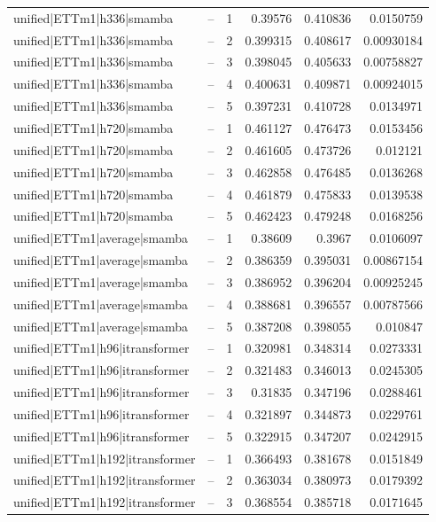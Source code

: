 \begin{longtable}{llrrrr}
unified|ETTm1|h336|smamba & -- & 1 & 0.39576 & 0.410836 & 0.0150759 \\
unified|ETTm1|h336|smamba & -- & 2 & 0.399315 & 0.408617 & 0.00930184 \\
unified|ETTm1|h336|smamba & -- & 3 & 0.398045 & 0.405633 & 0.00758827 \\
unified|ETTm1|h336|smamba & -- & 4 & 0.400631 & 0.409871 & 0.00924015 \\
unified|ETTm1|h336|smamba & -- & 5 & 0.397231 & 0.410728 & 0.0134971 \\
unified|ETTm1|h720|smamba & -- & 1 & 0.461127 & 0.476473 & 0.0153456 \\
unified|ETTm1|h720|smamba & -- & 2 & 0.461605 & 0.473726 & 0.012121 \\
unified|ETTm1|h720|smamba & -- & 3 & 0.462858 & 0.476485 & 0.0136268 \\
unified|ETTm1|h720|smamba & -- & 4 & 0.461879 & 0.475833 & 0.0139538 \\
unified|ETTm1|h720|smamba & -- & 5 & 0.462423 & 0.479248 & 0.0168256 \\
unified|ETTm1|average|smamba & -- & 1 & 0.38609 & 0.3967 & 0.0106097 \\
unified|ETTm1|average|smamba & -- & 2 & 0.386359 & 0.395031 & 0.00867154 \\
unified|ETTm1|average|smamba & -- & 3 & 0.386952 & 0.396204 & 0.00925245 \\
unified|ETTm1|average|smamba & -- & 4 & 0.388681 & 0.396557 & 0.00787566 \\
unified|ETTm1|average|smamba & -- & 5 & 0.387208 & 0.398055 & 0.010847 \\
unified|ETTm1|h96|itransformer & -- & 1 & 0.320981 & 0.348314 & 0.0273331 \\
unified|ETTm1|h96|itransformer & -- & 2 & 0.321483 & 0.346013 & 0.0245305 \\
unified|ETTm1|h96|itransformer & -- & 3 & 0.31835 & 0.347196 & 0.0288461 \\
unified|ETTm1|h96|itransformer & -- & 4 & 0.321897 & 0.344873 & 0.0229761 \\
unified|ETTm1|h96|itransformer & -- & 5 & 0.322915 & 0.347207 & 0.0242915 \\
unified|ETTm1|h192|itransformer & -- & 1 & 0.366493 & 0.381678 & 0.0151849 \\
unified|ETTm1|h192|itransformer & -- & 2 & 0.363034 & 0.380973 & 0.0179392 \\
unified|ETTm1|h192|itransformer & -- & 3 & 0.368554 & 0.385718 & 0.0171645 \\

\end{longtable}
